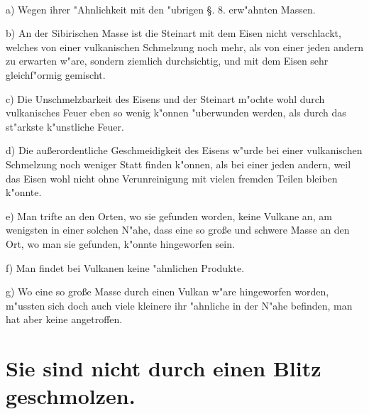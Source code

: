 \documentclass[a4paper, 11pt, oneside, polutonikogreek, german]{article}
\begin{document}
\paragraph{}
a) Wegen ihrer "Ahnlichkeit mit den "ubrigen §. 8. erw"ahnten Massen.

b) An der Sibirischen Masse ist die Steinart mit dem Eisen nicht verschlackt, welches von einer vulkanischen Schmelzung noch mehr, als von einer jeden andern zu erwarten w"are, sondern ziemlich durchsichtig, und mit dem Eisen sehr gleichf"ormig gemischt.

c) Die Unschmelzbarkeit des Eisens und der Steinart m"ochte wohl durch vulkanisches Feuer eben so wenig k"onnen "uberwunden werden, als durch das st"arkste k"unstliche Feuer.

d) Die außerordentliche Geschmeidigkeit des Eisens w"urde bei einer vulkanischen Schmelzung noch weniger Statt finden k"onnen, als bei einer jeden andern, weil das Eisen wohl nicht ohne Verunreinigung mit vielen fremden Teilen bleiben k"onnte.

e) Man trifte an den Orten, wo sie gefunden worden, keine Vulkane an, am wenigsten in einer solchen N"ahe, dass eine so große und schwere Masse an den Ort, wo man sie gefunden, k"onnte hingeworfen sein.

f) Man findet bei Vulkanen keine "ahnlichen Produkte.

g) Wo eine so große Masse durch einen Vulkan w"are hingeworfen worden, m"ussten sich doch auch viele kleinere ihr "ahnliche in der N"ahe befinden, man hat aber keine angetroffen.
\clearpage
\section{Sie sind nicht durch einen Blitz geschmolzen.}
\end{document}
